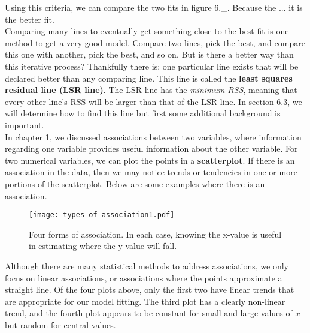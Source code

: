 Using this criteria, we can compare the two fits in figure 6.\_. Because the ... it is the better fit. \\

Comparing many lines to eventually get something close to the best fit is one method to get a very good model. Compare two lines, pick the best, and compare this one with another, pick the best, and so on. But is there a better way than this iterative process? Thankfully there is; one particular line exists that will be declared better than any comparing line. This line is called the \textbf{least squares residual line (LSR line)}. The LSR line has the \textit{minimum RSS}, meaning that every other line's RSS will be larger than that of the LSR line. In section 6.3, we will determine how to find this line but first some additional background is important. \\


In chapter 1, we discussed associations between two variables, where information regarding one variable provides useful information about the other variable. For two numerical variables, we can plot the points in a \textbf{scatterplot}. If there is an association in the data, then we may notice trends or tendencies in one or more portions of the scatterplot. Below are some examples where there is an association. 
\begin{figure}[htp]
\centering
\texttt{[image: types-of-association1.pdf]}
\caption{Four forms of association. In each case, knowing the x-value is useful in estimating where the y-value will fall.} %
\end{figure}
Although there are many statistical methods to address associations, we only focus on linear associations, or associations where the points approximate a straight line. Of the four plots above, only the first two have linear trends that are appropriate for our model fitting. The third plot has a clearly non-linear trend, and the fourth plot appears to be constant for small and large values of $x$ but random for central values. \\

